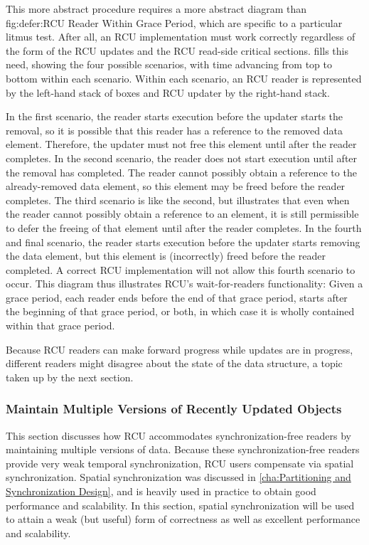 This more abstract procedure requires a more abstract diagram than
{fig:defer:RCU Reader Within Grace Period},
which are specific to a particular litmus test.
After all, an RCU implementation must work correctly regardless of
the form of the RCU updates and the RCU read-side critical sections.
fills this need, showing the four possible scenarios, with time
advancing from top to bottom within each scenario.
Within each scenario, an RCU reader is represented by the left-hand
stack of boxes and RCU updater by the right-hand stack.

In the first scenario, the reader starts execution before the
updater starts the removal, so it is possible that this reader
has a reference to the removed data element.
Therefore, the updater must not free this element until after the
reader completes.
In the second scenario, the reader does not start execution until
after the removal has completed.
The reader cannot possibly obtain a reference to the already-removed
data element, so this element may be freed before the reader completes.
The third scenario is like the second, but illustrates that even when the
reader cannot possibly obtain a reference to an element, it is still
permissible to defer the freeing of that element until after the
reader completes.
In the fourth and final scenario, the reader starts execution before
the updater starts removing the data element, but this element
is (incorrectly) freed before the reader completed.
A correct RCU implementation will not allow this fourth scenario to
occur.
This diagram thus illustrates RCU's wait-for-readers functionality:
Given a grace period, each reader ends before the end of that grace
period, starts after the beginning of that grace period, or both, in
which case it is wholly contained within that grace period.

Because RCU readers can make forward progress while updates
are in progress, different readers might disagree about the state
of the data structure, a topic taken up by the next section.

\subsubsection{Maintain Multiple Versions of Recently Updated Objects}
\label{sec:defer:Maintain Multiple Versions of Recently Updated Objects}

This section discusses how RCU accommodates synchronization-free readers
by maintaining multiple versions of data.
Because these synchronization-free readers provide very weak temporal
synchronization, RCU users compensate via spatial synchronization.
Spatial synchronization was discussed in
\cref{cha:Partitioning and Synchronization Design}, and is heavily used
in practice to obtain good performance and scalability.
In this section, spatial synchronization will be used to attain a weak
(but useful) form of correctness as well as excellent performance and
scalability.

